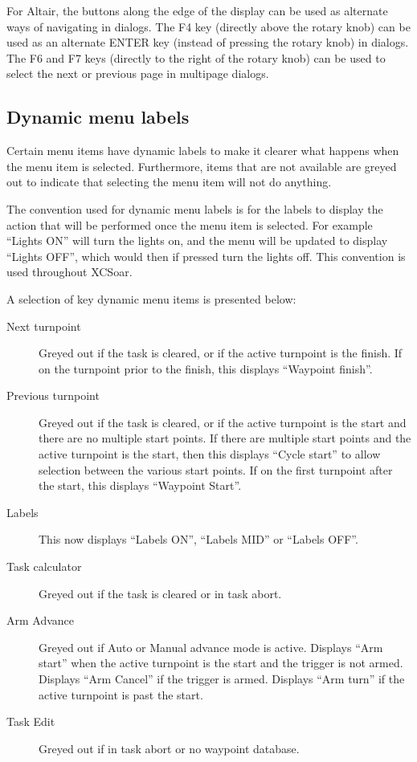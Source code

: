 \documentclass[a4paper,12pt]{refrep}
\begin{document}
For Altair, the buttons along the edge of the display can be used as
alternate ways of navigating in dialogs.  The F4 key (directly above
the rotary knob) can be used as an alternate ENTER key (instead of
pressing the rotary knob) in dialogs.  The F6 and F7 keys (directly to
the right of the rotary knob) can be used to select the next or
previous page in multipage dialogs.

\subsection*{Dynamic menu labels}
Certain menu items have dynamic labels to make it clearer what happens when the
menu item is selected.  Furthermore, items that are not available are greyed
out to indicate that selecting the menu item will not do anything.

The convention used for dynamic menu labels is for the labels to display the
action that will be performed once the menu item is selected. For example 
``Lights ON'' will turn the lights on, and the menu will be updated to display
``Lights OFF'', which would then if pressed turn the lights off. This
convention is used throughout XCSoar.

A selection of key dynamic menu items is presented below:
\begin{description}
\item[Next turnpoint]  
  Greyed out if the task is cleared, or if the active turnpoint is the
  finish. If on the turnpoint prior to the finish, this displays
  ``Waypoint finish''.
\item[Previous turnpoint]  
  Greyed out if the task is cleared, or if the active turnpoint is the
  start and there are no multiple start points.  If there are multiple
  start points and the active turnpoint is the start, then this
  displays ``Cycle start'' to allow selection between the various
  start points.  If on the first turnpoint after the start, this
  displays ``Waypoint Start''.
\item[Labels]  
  This now displays ``Labels ON'', ``Labels MID'' or ``Labels OFF''.
\item[Task calculator]  
  Greyed out if the task is cleared or in task abort.
\item[Arm Advance]  
  Greyed out if Auto or Manual advance mode is active.  Displays ``Arm
  start'' when the active turnpoint is the start and the trigger is
  not armed.  Displays ``Arm Cancel'' if the trigger is armed.
  Displays ``Arm turn'' if the active turnpoint is past the start.
\item[Task Edit]
  Greyed out if in task abort or no waypoint database.
\end{description}
\end{document}
